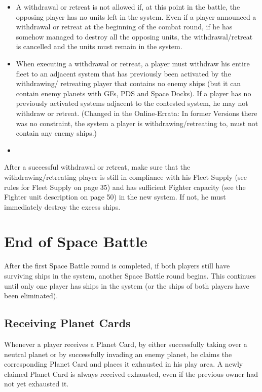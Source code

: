 \documentclass[11pt,fleqn]{book} %
\begin{document}
\begin{itemize}
\item A withdrawal or retreat is not allowed if, at this point in the battle, the opposing player has no units left in the system. Even if a player announced a withdrawal or retreat at the beginning of the combat round, if he has somehow managed to destroy all the opposing units, the withdrawal/retreat is cancelled and the units must remain in the system.
\item When executing a withdrawal or retreat, a player must withdraw his entire fleet to an adjacent system that has previously been activated by the withdrawing/ retreating player that contains no enemy ships (but it can contain enemy planets with GFs, PDS and Space Docks). If a player has no previously activated systems adjacent to the contested system, he may not withdraw or retreat. (Changed in the Online-Errata: In former Versions there was no constraint, the system a player is withdrawing/retreating to, must not contain any enemy ships.)

    \item 
\end{itemize}
After a successful withdrawal or retreat, make sure that the withdrawing/retreating player is still in compliance with his Fleet Supply (see rules for Fleet Supply on page 35) and has sufficient Fighter capacity (see the Fighter unit description on page 50) in the new system. If not, he must immediately destroy the excess ships.

\section{End of Space Battle}
After the first Space Battle round is completed, if both players still have surviving ships in the system, another Space Battle round begins. This continues until only one player has ships in the system (or the ships of both players have been eliminated).

\begin{FFGbox}
\subsection{Receiving Planet Cards}
Whenever a player receives a Planet Card, by either successfully taking over a neutral planet or by successfully invading an enemy planet, he claims the corresponding Planet Card and places it exhausted in his play area. A newly claimed Planet Card is always received exhausted, even if the previous owner had not yet exhausted it.
\end{FFGbox}
\end{document}
